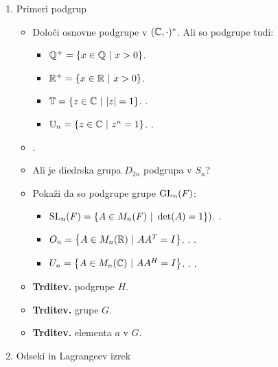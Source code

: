 \begin{enumerate}
    \newpage
    \item Primeri podgrup
    \begin{itemize}
        \item Določi osnovne podgrupe v $(\mathbb{C}, \cdot)^*$. Ali so podgrupe tudi:
        \begin{itemize}
            \item $\mathbb{Q}^+ = \left\{x \in \mathbb{Q} \ | \ x > 0\right\}$.
            \item $\mathbb{R}^+ = \left\{x \in \mathbb{R} \ | \ x > 0\right\}$.
            \item $\mathbb{T} = \left\{z \in \mathbb{C} \ | \ |z| = 1\right\}$. .
            \item $\mathbb{U}_n = \left\{z \in \mathbb{C} \ | \ z^n = 1\right\}$. .
        \end{itemize}
        \item {}.
        \item Ali je diedrska grupa $D_{2n}$ podgrupa v $S_n$?
        \item Pokaži da so podgrupe grupe $\operatorname{GL}_n(F)$:
        \begin{itemize}
            \item $\operatorname{SL}_n(F) = \left\{A \in M_n(F) \ | \ \det(A) = 1\right\})$. .
            \item $O_n = \left\{A \in M_n(\mathbb{R}) \ | \ AA^T = I\right\}$. . .
            \item $U_n = \left\{A \in M_n(\mathbb{C}) \ | \ AA^H = I\right\}$. . .
        \end{itemize}
        \item \colorbox{blue!30}{\textbf{Trditev.}}  podgrupe $H$.
        \item \colorbox{blue!30}{\textbf{Trditev.}}  grupe $G$.
        \item \colorbox{blue!30}{\textbf{Trditev.}}  elementa $a$ v $G$.
    \end{itemize}

    \item Odseki in Lagrangeev izrek
    

\end{enumerate}
